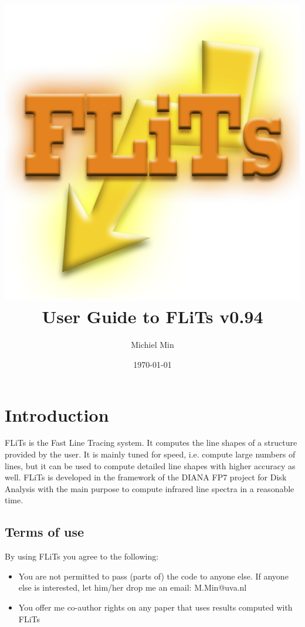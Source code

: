\documentclass[12pt]{article}
\begin{document}
\title{\includegraphics[width=0.9\hsize]{Logo_FLiTs}\\User Guide to FLiTs v0.94}
\author{Michiel Min}
\date{\today}
\maketitle

\section{Introduction}

FLiTs is the Fast Line Tracing system. It computes the line shapes of a structure provided by the user. It is mainly tuned for speed, i.e. compute large numbers of lines, but it can be used to compute detailed line shapes with higher accuracy as well. FLiTs is developed in the framework of the DIANA FP7 project for Disk Analysis with the main purpose to compute infrared line spectra in a reasonable time.

\subsection{Terms of use}

By using FLiTs you agree to the following:
\begin{itemize}
\item You are not permitted to pass (parts of) the code to anyone else. If anyone else is interested, let him/her drop me an email: M.Min@uva.nl
\item You offer me co-author rights on any paper that uses results computed with FLiTs
\end{itemize}
\end{document}
